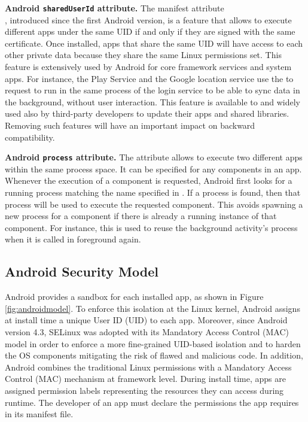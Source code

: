 \textbf{Android \texttt{sharedUserId} attribute.} The manifest attribute \\ \shared, introduced since the first Android version, is a feature that allows to execute different apps under the same UID if and only if they are signed with the same certificate. Once installed, apps that share the same UID will have access to each other private data because they share the same Linux permissions set. This feature is extensively used by Android for core framework services and system apps. For instance, the Play Service and the Google location service use the \shared to request to run in the same process of the login service to be able to sync data in the background, without  user interaction. This feature is available to and widely used also by third-party developers to update their apps and shared libraries. Removing such features will have  an important impact on backward compatibility.
  
\textbf{Android \texttt{process} attribute.} The attribute \proc allows to execute two different apps within the same process space. It can be specified for any components in an app. Whenever the execution of  a component is requested, Android first looks for a running process matching the name specified in \proc. If a process is found, then that process will be used to execute the requested component. This avoids spawning a new process for a component if there is already a running instance of that component. For instance, this is used to reuse the background activity's process when it is called in foreground again.



\subsection{Android Security Model} 
Android provides a sandbox for each installed app, as shown in Figure \ref{fig:androidmodel}. To enforce this isolation at the Linux kernel, Android assigns at install time a unique User ID (UID) to each app. 
Moreover, since Android version 4.3, SELinux was adopted with its Mandatory Access Control (MAC) model in order  to enforce a more fine-grained UID-based isolation and to harden the OS components mitigating the risk of flawed and malicious code.  In addition, Android combines the traditional Linux permissions with a Mandatory Access Control (MAC) mechanism at framework level. During install time, apps are assigned permission labels representing the resources they can access during runtime. The developer of an app must declare the permissions the app requires in its manifest file. 

